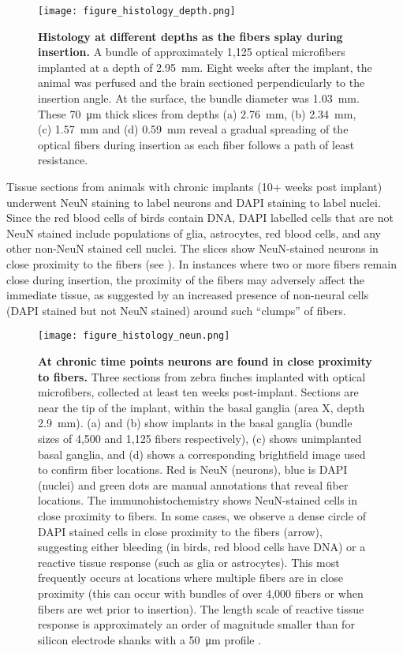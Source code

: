 \begin{figure}
\texttt{[image: figure\_histology\_depth.png]}
\caption[Histology showing microfibers at different 
implant depths.]{\textbf{Histology at different depths as the 
fibers splay during insertion.} A bundle of approximately 
1,125 optical microfibers implanted at a depth of 2.95~mm. 
Eight weeks after the implant, the animal was perfused 
and the brain sectioned perpendicularly to 
the insertion angle. At the surface, the bundle diameter 
was 1.03~mm. These 70~\si{\micro\meter} thick slices from depths 
(a) 2.76~mm, (b) 2.34~mm, (c) 1.57~mm and (d) 0.59~mm 
reveal a gradual spreading of the optical fibers during insertion as each fiber 
follows a path of least resistance.}
\label{fig:histology_depth}
\end{figure}

Tissue sections from animals with chronic implants 
(10+ weeks post implant) underwent NeuN staining to label 
neurons and DAPI staining to label nuclei. Since the red blood 
cells of birds contain DNA, DAPI labelled cells that are not 
NeuN stained include populations of glia, astrocytes, red blood 
cells, and any other non-NeuN stained cell nuclei. The slices 
show NeuN-stained neurons in close proximity to the fibers (see 
). In instances where two or more fibers remain close 
during insertion, the proximity of the fibers may adversely 
affect the immediate tissue, as suggested by an increased 
presence of non-neural cells (DAPI stained but not NeuN stained) 
around such ``clumps'' of fibers.

\begin{figure}
\texttt{[image: figure\_histology\_neun.png]}
\caption[NeuN and DAPI staining of tissue at fiber 
implant tips.]{\textbf{At chronic time points neurons are found in 
close proximity to fibers.} Three sections from zebra finches implanted with 
optical microfibers, collected at least ten weeks post-implant. 
Sections are near the tip of the implant, within the basal ganglia 
(area X, depth 2.9~mm). (a) and (b) show implants in the basal 
ganglia (bundle sizes of 4,500 and 1,125 fibers respectively), 
(c) shows unimplanted basal ganglia, and (d) shows a 
corresponding brightfield image used to confirm fiber locations. 
Red is NeuN (neurons), blue 
is DAPI (nuclei) and green dots are manual annotations that 
reveal fiber locations. 
The immunohistochemistry shows NeuN-stained cells in close 
proximity to fibers. In some cases, we observe a dense 
circle of DAPI stained cells in close proximity to the 
fibers (arrow), suggesting either bleeding (in birds, red 
blood cells have DNA) or a reactive tissue response (such as glia 
or astrocytes). This most frequently occurs at locations 
where multiple fibers are in close proximity (this can 
occur with bundles of over 4,000 fibers or when fibers are 
wet prior to insertion). The length scale of reactive 
tissue response is approximately an order of magnitude 
smaller than for silicon electrode shanks with a 50~\si{\micro\meter} 
profile \cite{Szarowski:2003cz}.}
\label{fig:histology_neun}
\end{figure}

